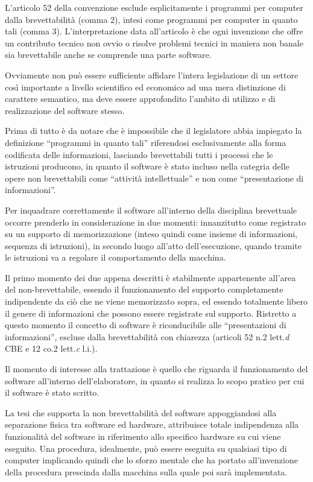 L'articolo 52  della convenzione esclude esplicitamente i programmi per computer dalla brevettabilità (comma 2), intesi come programmi per computer in quanto tali (comma 3). L'interpretazione data all'articolo è che ogni invenzione che offre un contributo tecnico non ovvio o risolve problemi tecnici in maniera non banale sia brevettabile anche se comprende una parte software.

Ovviamente non può essere sufficiente affidare l'intera legislazione di un settore così importante a livello scientifico ed economico ad una mera distinzione di carattere semantico, ma deve essere approfondito l'ambito di utilizzo e di realizzazione del software stesso.

Prima di tutto è da notare che è impossibile che il legislatore abbia impiegato la definizione ``programmi in quanto tali'' riferendosi esclusivamente alla forma codificata delle informazioni, lasciando brevettabili tutti i processi che le istruzioni producono, in quanto il software è stato incluso nella categria delle opere non brevettabili come ``attività intellettuale'' e non come ``presentazione di informazioni''.

Per inquadrare correttamente il software all'interno della disciplina brevettuale occorre prenderlo in considerazione in due momenti: innanzitutto come registrato su un supporto di memorizzazione (inteso quindi come insieme di informazioni, sequenza di istruzioni), in secondo luogo all'atto dell'esecuzione, quando tramite le istruzioni va a regolare il comportamento della macchina.

Il primo momento dei due appena descritti è stabilmente appartenente all'area del non-brevettabile, essendo il funzionamento del supporto completamente indipendente da ciò che ne viene memorizzato sopra, ed essendo totalmente libero il genere di informazioni che possono essere registrate sul supporto. Ristretto a questo momento il concetto di software è riconducibile alle ``presentazioni di informazioni'', escluse dalla brevettabilità con chiarezza (articoli 52 n.2 lett.\textit{d} CBE e 12 co.2 lett.\textit{c} l.i.).

Il momento di interesse alla trattazione è quello che riguarda il funzionamento del software all'interno dell'elaboratore, in quanto si realizza lo scopo pratico per cui il software è stato scritto.

La tesi che supporta la non brevettabilità del software appoggiandosi alla separazione fisica tra software ed hardware, attribuisce totale indipendenza alla funzionalità del software in riferimento allo specifico hardware su cui viene eseguito. Una procedura, idealmente, può essere eseguita su qualsiasi tipo di computer implicando quindi che lo sforzo mentale che ha portato all'invenzione della procedura prescinda dalla macchina sulla quale poi sarà implementata.

